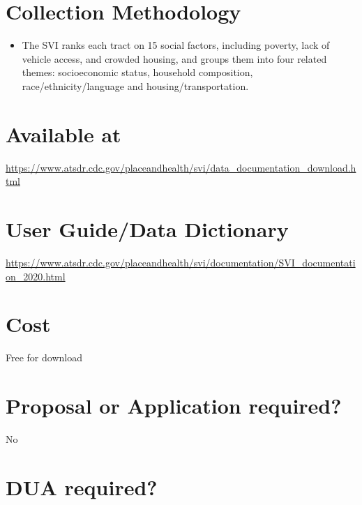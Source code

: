 \documentclass[
]{book}
\providecommand{\tightlist}{%
  \setlength{\itemsep}{0pt}\setlength{\parskip}{0pt}}
\begin{document}
\hypertarget{collection-methodology-81}{%
\section{Collection Methodology}\label{collection-methodology-81}}

\begin{itemize}
\tightlist
\item
  The SVI ranks each tract on 15 social factors, including poverty, lack of vehicle access, and crowded housing, and groups them into four related themes: socioeconomic status, household composition, race/ethnicity/language and housing/transportation.
\end{itemize}

\hypertarget{available-at-81}{%
\section{Available at}\label{available-at-81}}

\url{https://www.atsdr.cdc.gov/placeandhealth/svi/data_documentation_download.html}

\hypertarget{user-guidedata-dictionary-81}{%
\section{User Guide/Data Dictionary}\label{user-guidedata-dictionary-81}}

\url{https://www.atsdr.cdc.gov/placeandhealth/svi/documentation/SVI_documentation_2020.html}

\hypertarget{cost-81}{%
\section{Cost}\label{cost-81}}

Free for download

\hypertarget{proposal-or-application-required-81}{%
\section{Proposal or Application required?}\label{proposal-or-application-required-81}}

No

\hypertarget{dua-required-81}{%
\section{DUA required?}\label{dua-required-81}}
\end{document}
